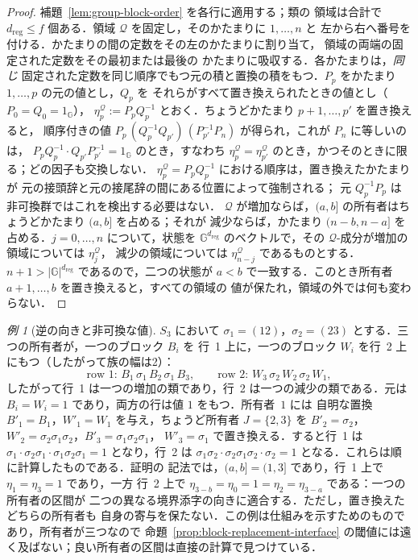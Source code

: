 \documentclass[11pt,a4paper]{ltjsarticle}
\numberwithin{equation}{section}
\theoremstyle{plain}
\theoremstyle{definition}
\theoremstyle{remark}
\newtheorem{example}[theorem]{例}
\theoremstyle{plain}
\begin{document}
\begin{proof}
補題~\ref{lem:group-block-order} を各行に適用する；類の
領域は合計で $d_{\mathrm{reg}}\le f$ 個ある．領域 $\mathcal Q$ を固定し，そのかたまりに $1,\ldots,n$ と
左から右へ番号を付ける．かたまりの間の定数をその左のかたまりに割り当て，
領域の両端の固定された定数をその最初または最後の
かたまりに吸収する．各かたまりは，\emph{同じ}
固定された定数を同じ順序でもつ元の積と置換の積をもつ．$P_p$ をかたまり $1,\ldots,p$ の元の値とし，$Q_p$ を
それらがすべて置き換えられたときの値とし（$P_0=Q_0=1_{\mathbb G}$），
$\eta^{\mathcal Q}_p:=P_pQ_p^{-1}$ とおく．ちょうどかたまり $p+1,\ldots,p'$ を置き換えると，
順序付きの値 $P_p\,(Q_p^{-1}Q_{p'})\,(P_{p'}^{-1}P_n)$ が得られ，これが $P_n$ に等しいのは，
$P_pQ_p^{-1}\cdot Q_{p'}P_{p'}^{-1}=1_{\mathbb G}$ のとき，すなわち
$\eta^{\mathcal Q}_p=\eta^{\mathcal Q}_{p'}$ のとき，かつそのときに限る；どの因子も交換しない．
$\eta^{\mathcal Q}_p=P_pQ_p^{-1}$ における順序は，置き換えたかたまりが
元の接頭辞と元の接尾辞の間にある位置によって強制される；
元 $Q_p^{-1}P_p$ は非可換群ではこれを検出する必要はない．
$\mathcal Q$ が増加ならば，$(a,b]$ の所有者はちょうどかたまり $(a,b]$ を占める；それが
減少ならば，かたまり $(n-b,n-a]$ を占める．$j=0,\ldots,n$ について，状態を
${\mathbb G}^{d_{\mathrm{reg}}}$ のベクトルで，その $\mathcal Q$-成分が増加の領域については $\eta^{\mathcal Q}_j$，
減少の領域については $\eta^{\mathcal Q}_{n-j}$ であるものとする．$n+1>|{\mathbb G}|^{d_{\mathrm{reg}}}$ であるので，二つの状態が
$a<b$ で一致する．このとき所有者 $a+1,\ldots,b$ を置き換えると，すべての領域の
値が保たれ，領域の外では何も変わらない．
\end{proof}

\begin{example}[逆の向きと非可換な値]
\label{ex:nonabelian-reverse-owner}
$S_3$ において $\sigma_1=(12)$，$\sigma_2=(23)$ とする．三つの所有者が，一つのブロック $B_i$ を
行~1 上に，一つのブロック $W_i$ を行~2 上にもつ（したがって族の幅は2）：
\[
 \text{row 1: }B_1\,\sigma_1\,B_2\,\sigma_1\,B_3,\qquad
 \text{row 2: }W_3\,\sigma_2\,W_2\,\sigma_2\,W_1,
\]
したがって行~1 は一つの増加の類であり，行~2 は一つの減少の類である．元は
$B_i=W_i=1$ であり，両方の行は値 $1$ をもつ．所有者~$1$ には
自明な置換 $B'_1=B_1$，$W'_1=W_1$ を与え，ちょうど所有者
$J=\{2,3\}$ を $B'_2=\sigma_2$，$W'_2=\sigma_2\sigma_1\sigma_2$，$B'_3=\sigma_1\sigma_2\sigma_1$，
$W'_3=\sigma_1$ で置き換える．すると行~1 は
$\sigma_1\cdot\sigma_2\sigma_1\cdot\sigma_1\sigma_2\sigma_1=1$ となり，行~2 は
$\sigma_1\sigma_2\cdot\sigma_2\sigma_1\sigma_2\cdot\sigma_2=1$ となる．これらは順に計算したものである．証明の
記法では，$(a,b]=(1,3]$ であり，行~1 上で $\eta_1=\eta_3=1$ であり，一方
行~2 上で $\eta_{3-b}=\eta_0=1=\eta_2=\eta_{3-a}$ である：一つの所有者の区間が
二つの異なる境界添字の向きに適合する．ただし，置き換えたどちらの所有者も
自身の寄与を保たない．この例は仕組みを示すためのものであり，所有者が三つなので
命題~\ref{prop:block-replacement-interface} の閾値には遠く及ばない；良い所有者の区間は直接の計算で見つけている．
\end{example}
\end{document}
